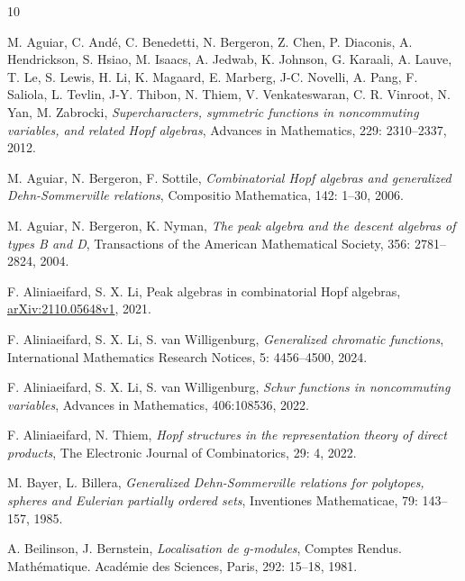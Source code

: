 \documentclass[11pt]{amsart}
\numberwithin{equation}{section}
\begin{document}
\begin{thebibliography}{10}

 M. Aguiar, C. Andé, C. Benedetti, N. Bergeron, Z. Chen, P. Diaconis, A. Hendrickson, S. Hsiao, M. Isaacs, A. Jedwab, K. Johnson, G. Karaali, A. Lauve, T. Le, S. Lewis, H. Li, K. Magaard, E. Marberg, J-C. Novelli, A. Pang, F. Saliola, L. Tevlin, J-Y. Thibon, N. Thiem, V. Venkateswaran, C. R. Vinroot, N. Yan, M. Zabrocki, 
\newblock \textit{Supercharacters, symmetric functions in noncommuting variables, and related Hopf algebras},
\newblock Advances in Mathematics, 229: 2310--2337, 2012.

 M. Aguiar, N. Bergeron, F. Sottile,
\newblock \textit{Combinatorial Hopf algebras and generalized Dehn-Sommerville relations},
\newblock Compositio Mathematica, 142: 1--30, 2006. 

 M. Aguiar, N. Bergeron, K. Nyman,
\newblock \textit{The peak algebra and the descent algebras of types B and D},
\newblock Transactions of the American Mathematical Society, 356: 2781--2824, 2004.

 F. Aliniaeifard, S. X. Li, Peak algebras in combinatorial Hopf algebras, 
\href{https://arxiv.org/abs/2110.05648v1}{arXiv:2110.05648v1}, 2021. 

 F. Aliniaeifard, S. X. Li, S. van Willigenburg, 
\newblock \textit{Generalized chromatic functions},
\newblock International Mathematics Research Notices, 5: 4456--4500, 2024.

 F. Aliniaeifard, S. X. Li, S. van Willigenburg, 
\newblock \textit{Schur functions in noncommuting variables},
\newblock Advances in Mathematics, 406:108536, 2022.

 F. Aliniaeifard, N. Thiem, 
\newblock \textit{Hopf structures in the representation theory of direct products}, 
\newblock The Electronic Journal of Combinatorics, 29: 4, 2022.

 M. Bayer, L. Billera,
\newblock\textit{Generalized Dehn-Sommerville relations for polytopes, spheres and Eulerian partially ordered sets},
\newblock Inventiones Mathematicae, 79: 143--157, 1985.

 A. Beilinson, J. Bernstein, 
\newblock\textit{Localisation de g-modules},
\newblock Comptes Rendus. Mathématique. Académie des Sciences, Paris,  292: 15--18, 1981.


\end{thebibliography}
\end{document}
